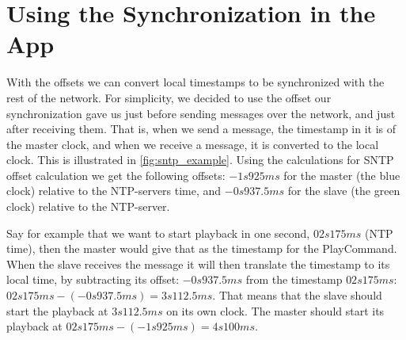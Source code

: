 \section{Using the Synchronization in the App}
With the offsets we can convert local timestamps to be synchronized with the rest of the network.
For simplicity, we decided to use the offset our synchronization gave us just before sending messages over the network, and just after receiving them.
That is, when we send a message, the timestamp in it is of the master clock, and when we receive a message, it is converted to the local clock.
This is illustrated in \ref{fig:sntp_example}.
Using the calculations for \ac{SNTP} offset calculation we get the following offsets:
$-1s925ms$ for the master (the blue clock) relative to the \ac{NTP}-servers time, and
$-0s937.5ms$ for the slave (the green clock) relative to the \ac{NTP}-server.

Say for example that we want to start playback in one second, $02s175ms$ (\ac{NTP} time), then the master would give that as the timestamp for the PlayCommand.
When the slave receives the message it will then translate the timestamp to its local time, by subtracting its offset:
$-0s937.5ms$ from the timestamp $02s175ms$: $02s175ms - (-0s937.5ms) = 3s112.5ms$.
That means that the slave should start the playback at $3s112.5ms$ on its own clock.
The master should start its playback at $02s175ms - (-1s925ms) = 4s100ms.$

